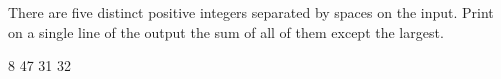 




There are five distinct positive integers separated by spaces on the input. Print on a single line of the output the sum of all of them except the largest.

 8 47 31 32
\koniec

